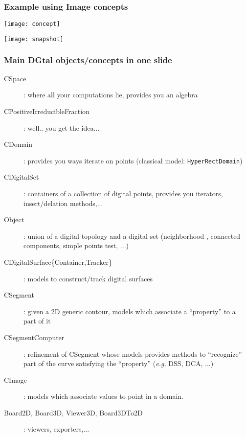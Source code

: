 \documentclass[8pt]{beamer}
\begin{document}
\begin{frame}
\frametitle{Example using Image concepts}
  \centering \texttt{[image: concept]}
\end{frame}



\begin{frame}
  \centering \texttt{[image: snapshot]}
\end{frame}

\begin{frame}
  \frametitle{Main DGtal objects/concepts in one slide}

  \begin{description}
    \item[CSpace]: where all your computations lie, provides you an algebra 

    \item[CPositiveIrreducibleFraction]: well.. you get the idea...

    \item[CDomain]:  provides you ways iterate on points (classical
      model: \texttt{HyperRectDomain}) 
    \item[CDigitalSet]: containers of a collection of digital points,
      provides you iterators, insert/delation methods,...

    \item[Object]: union of  a digital topology and a digital set
      (neighborhood , connected components, simple points test, ...)

    \item[CDigitalSurface\{Container,Tracker\}]: models to
      construct/track  digital surfaces 

\vspace{0.5cm}

    \item[CSegment]: given a 2D generic contour, models which
      associate a ``property'' to a part of it

    \item[CSegmentComputer]: refinement of CSegment whose models
      provides methods to ``recognize'' part of the curve satisfying
      the ``property'' (\emph{e.g.} DSS, DCA, ...)

\vspace{0.5cm}

    \item[CImage]: models which associate values to point in a
      domain. 

\vspace{0.5cm}

    \item[Board2D, Board3D, Viewer3D, Board3DTo2D]: viewers, exporters,...

  \end{description}

\end{frame}


\end{document}
